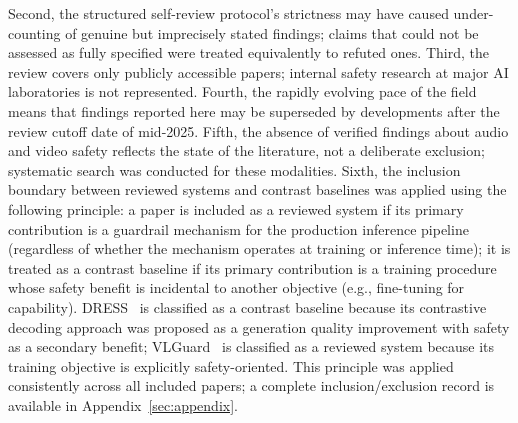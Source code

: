 Second, the structured self-review protocol's strictness may have caused
under-counting of genuine but imprecisely stated findings; claims that could not
be assessed as fully specified were treated equivalently to refuted ones.
Third, the review covers only publicly accessible papers; internal safety
research at major AI laboratories is not represented.
Fourth, the rapidly evolving pace of the field means that findings reported here
may be superseded by developments after the review cutoff date of mid-2025.
Fifth, the absence of verified findings about audio and video safety reflects
the state of the literature, not a deliberate exclusion; systematic search was
conducted for these modalities.
Sixth, the inclusion boundary between reviewed systems and contrast baselines was applied using the following principle: a paper is included as a reviewed system if its primary contribution is a guardrail mechanism for the production inference pipeline (regardless of whether the mechanism operates at training or inference time); it is treated as a contrast baseline if its primary contribution is a training procedure whose safety benefit is incidental to another objective (e.g., fine-tuning for capability).
DRESS~\cite{chen2024dresssafety} is classified as a contrast baseline because its contrastive decoding approach was proposed as a generation quality improvement with safety as a secondary benefit; VLGuard~\cite{li2024vlguard} is classified as a reviewed system because its training objective is explicitly safety-oriented.
This principle was applied consistently across all included papers; a complete inclusion/exclusion record is available in Appendix~\ref{sec:appendix}.
